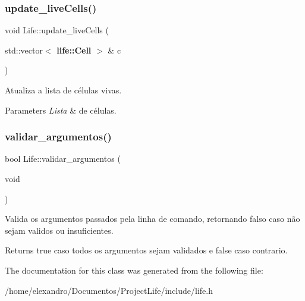 \subsubsection{update\+\_\+live\+Cells()}
{\footnotesize\ttfamily void Life\+::update\+\_\+live\+Cells (\begin{DoxyParamCaption}\item[{std\+::vector$<$ \textbf{ life\+::\+Cell} $>$ \&}]{c }\end{DoxyParamCaption})}

Atualiza a lista de células vivas. 
\begin{DoxyParams}{Parameters}
{\em Lista} & de células. \\
\hline
\end{DoxyParams}
\mbox{\label{class_life_ad74154245ad61d600ef15a245dfa918d}} 
\subsubsection{validar\+\_\+argumentos()}
{\footnotesize\ttfamily bool Life\+::validar\+\_\+argumentos (\begin{DoxyParamCaption}\item[{void}]{ }\end{DoxyParamCaption})}

Valida os argumentos passados pela linha de comando, retornando falso caso não sejam validos ou insuficientes. \begin{DoxyReturn}{Returns}
true caso todos os argumentos sejam validados e false caso contrario. 
\end{DoxyReturn}


The documentation for this class was generated from the following file\+:\begin{DoxyCompactItemize}
\item 
/home/elexandro/\+Documentos/\+Project\+Life/include/life.\+h\end{DoxyCompactItemize}
